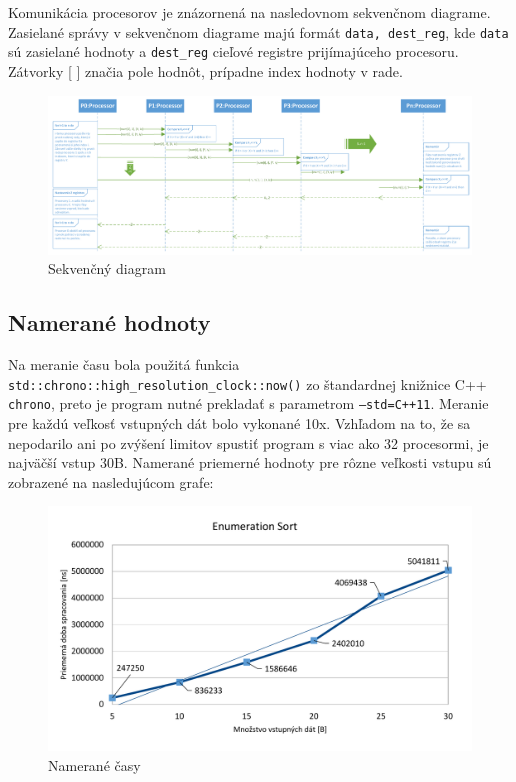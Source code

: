 \documentclass[a4paper,11pt]{article}
\begin{document}
Komunikácia procesorov je znázornená na nasledovnom sekvenčnom diagrame. Zasielané správy v sekvenčnom diagrame majú formát \texttt{data, dest\_reg}, kde \texttt{data} sú zasielané hodnoty a \texttt{dest\_reg} cieľové registre prijímajúceho procesoru. Zátvorky [ ] značia pole hodnôt, prípadne index hodnoty v rade.

\begin{figure}[!htb]
\centering
\includegraphics[width=\textwidth]{sequence.pdf}
\caption{Sekvenčný diagram}
\end{figure}

\subsection{Namerané hodnoty}
Na meranie času bola použitá funkcia \texttt{std::chrono::high\_resolution\_clock::now()} zo štandardnej knižnice C++ \texttt{chrono}, preto je program nutné prekladať s parametrom \texttt{--std=C++11}. Meranie pre každú veľkosť vstupných dát bolo vykonané 10x. Vzhľadom na to, že sa nepodarilo ani po zvýšení limitov spustiť program s viac ako 32 procesormi, je najväčší vstup 30B. Namerané priemerné hodnoty pre rôzne veľkosti vstupu sú zobrazené na nasledujúcom grafe:

\begin{figure}[!htb]
\centering
\includegraphics[width=\textwidth]{stats.pdf}
\caption{Namerané časy}
\end{figure}
\end{document}
